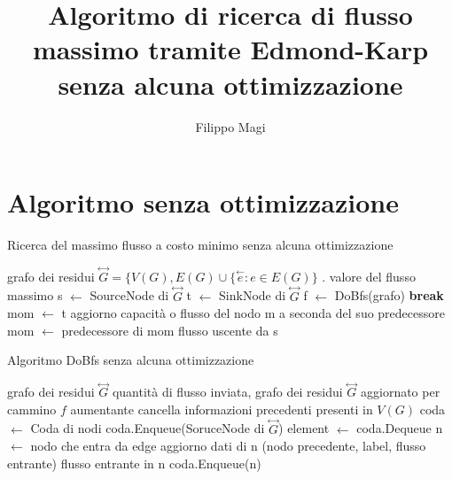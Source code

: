 \documentclass{article}
\title{Algoritmo di ricerca di flusso massimo tramite Edmond-Karp senza alcuna ottimizzazione}
\author{Filippo Magi }
\begin{document}
\maketitle

\section{Algoritmo senza ottimizzazione}

\begin{algorithm}
    \caption{Ricerca del massimo flusso a costo minimo senza alcuna ottimizzazione}
    \begin{algorithmic}
    \REQUIRE grafo dei residui $\overset{\leftrightarrow}{G} = \{V(G),E(G) \cup \{ \overset{\leftarrow}{e} : e \in E(G) \}$ .
    \ENSURE valore del flusso massimo
    \STATE s $\leftarrow$ SourceNode di  $\overset{\leftrightarrow}{G}$
    \STATE t $\leftarrow$ SinkNode di  $\overset{\leftrightarrow}{G}$
    \LOOP
    \STATE f $\leftarrow$ DoBfs(grafo)
    \STATE \textbf{break}
    \ENDIF
    \STATE mom $\leftarrow$ t
    \STATE aggiorno capacità o flusso del nodo m a seconda del suo predecessore
    \STATE mom $\leftarrow$ predecessore di mom
    \ENDWHILE
    \ENDLOOP
    \RETURN flusso uscente da s
    
    \end{algorithmic}
    \end{algorithm}
    
    \begin{algorithm}
    \caption{Algoritmo DoBfs senza alcuna ottimizzazione}
    \begin{algorithmic}
    \REQUIRE grafo dei residui $\overset{\leftrightarrow}{G}$
    \ENSURE quantità di flusso inviata, grafo dei residui $\overset{\leftrightarrow}{G}$ aggiornato per cammino $f$ aumentante
    \STATE cancella informazioni precedenti presenti in $V(G)$
    \STATE coda $\leftarrow$ Coda di nodi
    \STATE coda.Enqueue(SoruceNode di $\overset{\leftrightarrow}{G}$)
    \STATE element $\leftarrow$ coda.Dequeue
    \STATE n $\leftarrow$ nodo che entra da edge
    \STATE aggiorno dati di n (nodo precedente, label, flusso entrante)
    \RETURN flusso entrante in n
    \ELSE
    \STATE coda.Enqueue(n)
    \ENDIF
    \ENDIF
    \ENDFOR
    \ENDWHILE
    \end{algorithmic}
    \end{algorithm}
\end{document}

